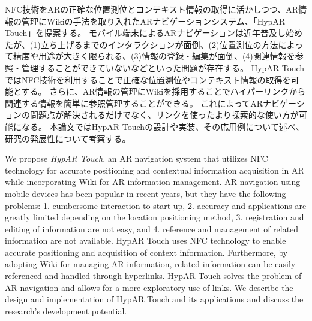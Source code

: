 


\begin{jabstract}
NFC技術をARの正確な位置測位とコンテキスト情報の取得に活かしつつ、AR情報の管理にWikiの手法を取り入れたARナビゲーションシステム、「HypAR Touch」を提案する。
モバイル端末によるARナビゲーションは近年普及し始めたが、(1)立ち上げるまでのインタラクションが面倒、(2)位置測位の方法によって精度や用途が大きく限られる、(3)情報の登録・編集が面倒、(4)関連情報を参照・管理することができていないなどといった問題が存在する。
HypAR TouchではNFC技術を利用することで正確な位置測位やコンテキスト情報の取得を可能とする。
さらに、AR情報の管理にWikiを採用することでハイパーリンクから関連する情報を簡単に参照管理することができる。
これによってARナビゲーションの問題点が解決されるだけでなく、リンクを使ったより探索的な使い方が可能になる。
本論文ではHypAR Touchの設計や実装、その応用例について述べ、研究の発展性について考察する。
\end{jabstract}



\begin{eabstract}
We propose \textit{HypAR Touch}, an AR navigation system that utilizes NFC technology for accurate positioning and contextual information acquisition in AR while incorporating Wiki for AR information management. 
AR navigation using mobile devices has been popular in recent years, but they have the following problems: 1. cumbersome interaction to start up, 2. accuracy and applications are greatly limited depending on the location positioning method, 3. registration and editing of information are not easy, and 4. reference and management of related information are not available. 
HypAR Touch uses NFC technology to enable accurate positioning and acquisition of context information. 
Furthermore, by adopting Wiki for managing AR information, related information can be easily referenced and handled through hyperlinks. 
HypAR Touch solves the problem of AR navigation and allows for a more exploratory use of links. 
We describe the design and implementation of HypAR Touch and its applications and discuss the research's development potential. 
\end{eabstract}
